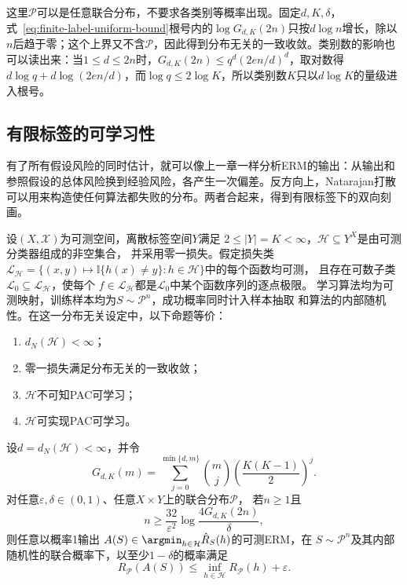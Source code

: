 这里$\mathcal P$可以是任意联合分布，不要求各类别等概率出现。固定$d,K,\delta$，式~\eqref{eq:finite-label-uniform-bound}根号内的$\log G_{d,K}(2n)$只按$d\log n$增长，除以$n$后趋于零；这个上界又不含$\mathcal P$，因此得到分布无关的一致收敛。类别数的影响也可以读出来：当$1\leq d\leq2n$时，$G_{d,K}(2n)\leq q^d(2en/d)^d$，取对数得$d\log q+d\log(2en/d)$，而$\log q\leq2\log K$，所以类别数$K$只以$d\log K$的量级进入根号。

\subsection{有限标签的可学习性}

有了所有假设风险的同时估计，就可以像上一章一样分析ERM的输出：从输出和参照假设的总体风险换到经验风险，各产生一次偏差。反方向上，Natarajan打散可以用来构造使任何算法都失败的分布。两者合起来，得到有限标签下的双向刻画。

\begin{theorem}[有限标签的可学习性刻画]
\label{thm:finite-label-learnability}
设$(X,\mathcal X)$为可测空间，离散标签空间$Y$满足
$2\leq|Y|=K<\infty$，$\mathcal H\subseteq Y^X$是由可测分类器组成的非空集合，
并采用零一损失。假定损失类
$\mathcal L_{\mathcal H}
=\{(x,y)\mapsto\mathbb I\{h(x)\neq y\}:h\in\mathcal H\}$中的每个函数均可测，
且存在可数子类$\mathcal L_0\subseteq\mathcal L_{\mathcal H}$，使每个
$f\in\mathcal L_{\mathcal H}$都是$\mathcal L_0$中某个函数序列的逐点极限。
学习算法均为可测映射，训练样本均为$S\sim\mathcal P^n$，成功概率同时计入样本抽取
和算法的内部随机性。在这一分布无关设定中，以下命题等价：
\begin{enumerate}
 \item $d_N(\mathcal H)<\infty$；
 \item 零一损失满足分布无关的一致收敛；
 \item $\mathcal H$不可知PAC可学习；
 \item $\mathcal H$可实现PAC可学习。
\end{enumerate}

设$d=d_N(\mathcal H)<\infty$，并令
\[
 G_{d,K}(m)=\sum_{j=0}^{\min\{d,m\}}\binom mj
 \left(\frac{K(K-1)}2\right)^j.
\]
对任意$\varepsilon,\delta\in(0,1)$、任意$X\times Y$上的联合分布$\mathcal P$，
若$n\geq1$且
\[
 n\geq\frac{32}{\varepsilon^2}\log\frac{4G_{d,K}(2n)}{\delta},
\]
则任意以概率1输出
$A(S)\in\argmin_{h\in\mathcal H}\hat R_S(h)$的可测ERM，在
$S\sim\mathcal P^n$及其内部随机性的联合概率下，以至少$1-\delta$的概率满足
\[
 R_{\mathcal P}(A(S))\leq\inf_{h\in\mathcal H}R_{\mathcal P}(h)+\varepsilon.
\]
\end{theorem}

